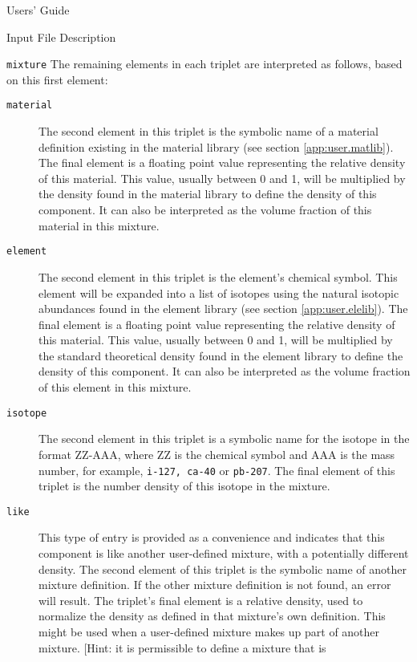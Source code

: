 \begin{chapter}{Users' Guide\label{app:user.guide}}
\begin{section}{Input File Description\label{app:user.input}}
\begin{subsection}{\texttt{mixture}\label{app:user.input.mix}}
      The remaining elements in each triplet are interpreted as
      follows, based on this first element:
      \begin{description}
      \item[\texttt{material}] The second element in this triplet is
        the symbolic name of a material definition existing in the
        material library (see section \ref{app:user.matlib}).  The
        final element is a floating point value representing the
        relative density of this material.  This value, usually
        between 0 and 1, will be multiplied by the density found in
        the material library to define the density of this component.
        It can also be interpreted as the volume fraction of this
        material in this mixture.
      \item[\texttt{element}] The second element in this triplet is
        the element's chemical symbol.  This element will be expanded
        into a list of isotopes using the natural isotopic abundances
        found in the element library (see section
        \ref{app:user.elelib}).  The final element is a floating point
        value representing the relative density of this material.
        This value, usually between 0 and 1, will be multiplied by the
        standard theoretical density found in the element library to
        define the density of this component.  It can also be
        interpreted as the volume fraction of this element in this
        mixture.
      \item[\texttt{isotope}] The second element in this triplet is a
        symbolic name for the isotope in the format ZZ-AAA, where ZZ
        is the chemical symbol and AAA is the mass number, for
        example, \texttt{i-127, ca-40} or \texttt{pb-207}.  The final
        element of this triplet is the number density of this isotope
        in the mixture.
      \item[\texttt{like}] This type of entry is provided as a
        convenience and indicates that this component is like another
        user-defined mixture, with a potentially different density.
        The second element of this triplet is the symbolic name of
        another mixture definition.  If the other mixture definition
        is not found, an error will result.  The triplet's final
        element is a relative density, used to normalize the density
        as defined in that mixture's own definition.  This might be
        used when a user-defined mixture makes up part of another
        mixture.  [Hint: it is permissible to define a mixture that is

\end{description}
\end{subsection}
\end{section}
\end{chapter}
